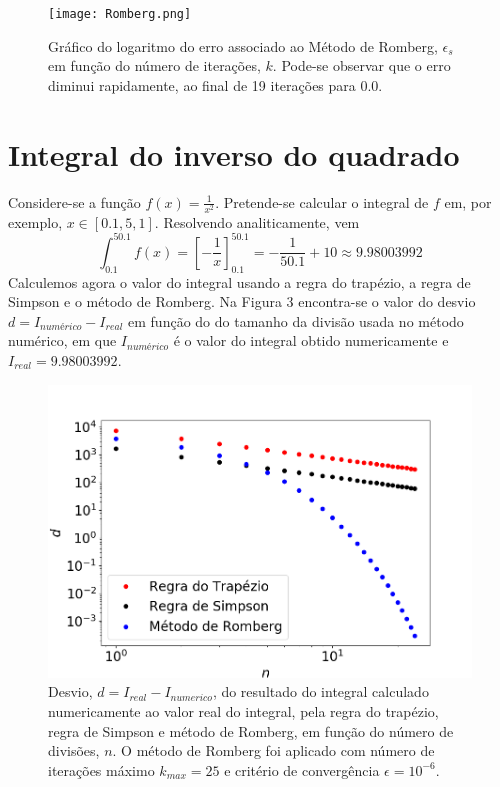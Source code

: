 \documentclass[aps,pre,twocolumn,showpacs,amsmath,amssymb]{revtex4-1}
\begin{document}
\begin{figure}[h!]
   \begin{center}
    \texttt{[image: Romberg.png]} \\
\caption{Gráfico do logaritmo do erro associado ao Método de Romberg, $\epsilon_s$ em função do número de iterações, $k$. Pode-se observar que o erro diminui rapidamente, ao final de 19 iterações para 0.0.}
  \label{fig.exemplo}
   \end{center}
  \end{figure}

\section{Integral do inverso do quadrado}
Considere-se a função $f(x)=\frac{1}{x^2}$. Pretende-se calcular o integral de $f$ em, por exemplo, $x\in[0.1,5,1]$. Resolvendo analiticamente, vem\\
\begin{equation}
    \int_{0.1}^{50.1}f(x)=\left[-\frac{1}{x}\right]^{50.1}_{0.1}=-\frac{1}{50.1}+10 \approx 9.98003992
\end{equation}
Calculemos agora o valor do integral usando a regra do trapézio, a regra de Simpson e o método de Romberg. Na Figura 3 encontra-se o valor do desvio $d=I_{numérico}-I_{real}$ em função do do tamanho da divisão usada no método numérico, em que $I_{numérico}$ é o valor do integral obtido numericamente e $I_{real}=9.98003992$.\\
\begin{figure}[hbt!]
  \includegraphics[width=\columnwidth]{desvioinversesquare.png}
  \caption{Desvio, $d=I_{real}-I_{numerico}$, do resultado do integral calculado numericamente ao valor real do integral, pela regra do trapézio, regra de Simpson e método de Romberg, em função do número de divisões, $n$. O método de Romberg foi aplicado com número de iterações máximo $k_{max}=25$ e critério de convergência $\epsilon=10^{-6}$.}
  \label{desvioinversequare}
\end{figure}
\end{document}
